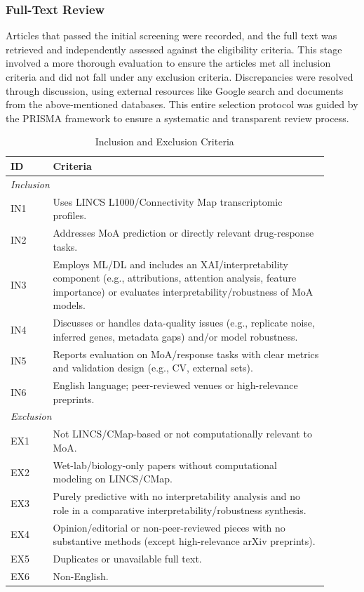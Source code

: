 \documentclass[twocolumn,12pt,a4paper]{article}
\begin{document}
\subsubsection{Full-Text Review}
Articles that passed the initial screening were recorded, and the full text was retrieved and independently assessed against the eligibility criteria.  This stage involved a more thorough evaluation to ensure the articles met all inclusion criteria and did not fall under any exclusion criteria. Discrepancies were resolved through discussion, using external resources like Google search and documents from the above-mentioned databases. This entire selection protocol was guided by the PRISMA framework to ensure a systematic and transparent review process.
\begin{table}[htbp]
\centering
\caption{Inclusion and Exclusion Criteria}
\begin{tabular}{p{0.12\linewidth} p{0.78\linewidth}}
\toprule
\textbf{ID} & \textbf{Criteria} \\
\midrule
\multicolumn{2}{l}{\textit{Inclusion}} \\
IN1 & Uses LINCS L1000/Connectivity Map transcriptomic profiles. \\
IN2 & Addresses MoA prediction or directly relevant drug-response tasks. \\
IN3 & Employs ML/DL and includes an XAI/interpretability component (e.g., attributions, attention analysis, feature importance) or evaluates interpretability/robustness of MoA models. \\
IN4 & Discusses or handles data-quality issues (e.g., replicate noise, inferred genes, metadata gaps) and/or model robustness. \\
IN5 & Reports evaluation on MoA/response tasks with clear metrics and validation design (e.g., CV, external sets). \\
IN6 & English language; peer-reviewed venues or high-relevance preprints. \\
\midrule
\multicolumn{2}{l}{\textit{Exclusion}} \\
EX1 & Not LINCS/CMap-based or not computationally relevant to MoA. \\
EX2 & Wet-lab/biology-only papers without computational modeling on LINCS/CMap. \\
EX3 & Purely predictive with no interpretability analysis and no role in a comparative interpretability/robustness synthesis.\\
EX4 & Opinion/editorial or non-peer-reviewed pieces with no substantive methods (except high-relevance arXiv preprints). \\
EX5 & Duplicates or unavailable full text. \\
EX6 & Non-English. \\
\bottomrule
\end{tabular}
\end{table}
\end{document}
